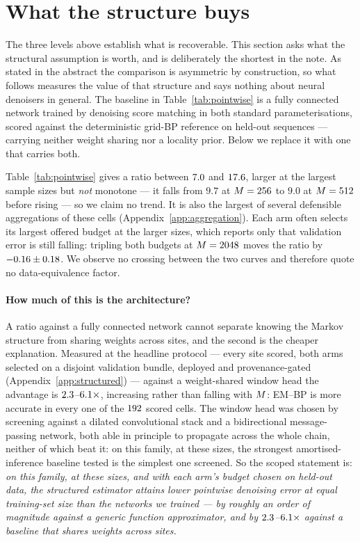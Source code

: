 \documentclass{article}
\theoremstyle{definition}
\theoremstyle{plain}
\begin{document}
\section{What the structure buys}
\label{sec:networks}

The three levels above establish what is recoverable. This section asks what the structural
assumption is worth, and is deliberately the shortest in the note. As stated in the abstract the
comparison is asymmetric by construction, so what follows measures the value of that structure and
says nothing about neural denoisers in general. The baseline in Table~\ref{tab:pointwise} is a
fully connected network trained by denoising score matching in both standard parameterisations,
scored against the deterministic grid-BP reference on held-out sequences --- carrying neither
weight sharing nor a locality prior. Below we replace it with one that carries both.



Table~\ref{tab:pointwise} gives a ratio between $7.0$ and $17.6$, larger at the largest
sample sizes but \emph{not} monotone --- it falls from $9.7$ at $M=256$ to $9.0$ at
$M=512$ before rising --- so we claim no trend. It is also the largest of several defensible
aggregations of these cells (Appendix~\ref{app:aggregation}). Each arm often selects its largest
offered budget at the larger sizes, which reports only that validation error is still falling:
tripling both budgets at $M=2048$ moves the ratio by $-0.16 \pm 0.18$.
We observe no crossing between the two curves and therefore quote no data-equivalence factor.

\paragraph{How much of this is the architecture?} A ratio against a fully connected network cannot
separate knowing the Markov structure from sharing weights across sites, and the second is the
cheaper explanation. Measured at the headline protocol --- every site scored, both arms selected
on a disjoint validation bundle, deployed and provenance-gated (Appendix~\ref{app:structured}) ---
against a weight-shared window head the advantage is $2.3$--$6.1\times$,
increasing rather than falling with $M$: EM--BP is more accurate in every one of the
$192$ scored cells. The window head was chosen by screening against a dilated
convolutional stack and a bidirectional message-passing network, both able in principle to
propagate across the whole chain, neither of which beat it: on this family, at these sizes, the strongest
amortised-inference baseline tested is the simplest one screened. So the scoped statement is:
\emph{on this family, at these sizes, and with each arm's budget chosen on held-out data, the
structured estimator attains lower pointwise denoising error at equal training-set size than the
networks we trained --- by roughly an order of magnitude against a generic function approximator,
and by $2.3$--$6.1\times$ against a baseline that shares weights across
sites.}
\end{document}
